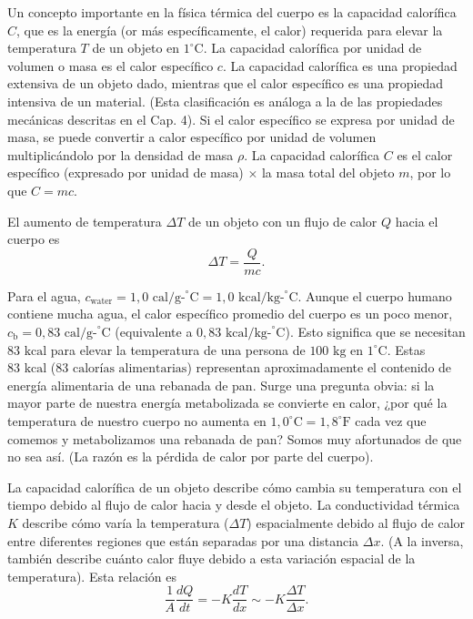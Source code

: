 \documentclass[12pt]{book}
\begin{document}
Un concepto importante en la física térmica del cuerpo es la capacidad calorífica $C$, que es la energía (or más específicamente, el calor) requerida para elevar la temperatura $T$ de un objeto en $1^\circ\text{C}$. La capacidad calorífica por unidad de volumen o masa es el calor específico $c$. La capacidad calorífica es una propiedad extensiva de un objeto dado, mientras que el calor específico es una propiedad intensiva de un material. (Esta clasificación es análoga a la de las propiedades mecánicas descritas en el Cap. 4). Si el calor específico se expresa por unidad de masa, se puede convertir a calor específico por unidad de volumen multiplicándolo por la densidad de masa $\rho$. La capacidad calorífica $C$ es el calor específico (expresado por unidad de masa) $\times$ la masa total del objeto $m$, por lo que $C = mc$.

El aumento de temperatura $\Delta T$ de un objeto con un flujo de calor $Q$ hacia el cuerpo es
\begin{equation}
\Delta T = \frac{Q}{mc}.
\label{eq:65}
\end{equation}

Para el agua, $c_{\text{water}} = 1{,}0\text{ cal/g-}^\circ\text{C} = 1{,}0\text{ kcal/kg-}^\circ\text{C}$. Aunque el cuerpo humano contiene mucha agua, el calor específico promedio del cuerpo es un poco menor, $c_{\text{b}} = 0{,}83\text{ cal/g-}^\circ\text{C}$ (equivalente a $0{,}83\text{ kcal/kg-}^\circ\text{C}$). Esto significa que se necesitan $83\text{ kcal}$ para elevar la temperatura de una persona de $100\text{ kg}$ en $1^\circ\text{C}$. Estas $83\text{ kcal}$ ($83\text{ calorías alimentarias}$) representan aproximadamente el contenido de energía alimentaria de una rebanada de pan. Surge una pregunta obvia: si la mayor parte de nuestra energía metabolizada se convierte en calor, ¿por qué la temperatura de nuestro cuerpo no aumenta en $1,0^\circ\text{C} = 1,8^\circ\text{F}$ cada vez que comemos y metabolizamos una rebanada de pan? Somos muy afortunados de que no sea así. (La razón es la pérdida de calor por parte del cuerpo).

La capacidad calorífica de un objeto describe cómo cambia su temperatura con el tiempo debido al flujo de calor hacia y desde el objeto. La conductividad térmica $K$ describe cómo varía la temperatura ($\Delta T$) espacialmente debido al flujo de calor entre diferentes regiones que están separadas por una distancia $\Delta x$. (A la inversa, también describe cuánto calor fluye debido a esta variación espacial de la temperatura). Esta relación es
\begin{equation}
\frac{1}{A} \frac{dQ}{dt} = -K \frac{dT}{dx} \sim -K \frac{\Delta T}{\Delta x}.
\label{eq:66}
\end{equation}
\end{document}
